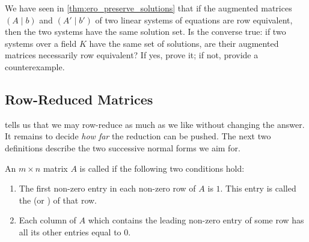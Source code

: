 \begin{exercise}
\label{exc:converse_ero_solution_set}
We have seen in \cref{thm:ero_preserve_solutions} that if the augmented matrices $(A \mid b)$ and $(A' \mid b')$ of two linear systems of equations are row equivalent, then the two systems have the same solution set. Is the converse true: if two systems over a field $K$ have the same set of solutions, are their augmented matrices necessarily row equivalent? If yes, prove it; if not, provide a counterexample.
\end{exercise}

\subsection{Row-Reduced Matrices}

 tells us that we may row-reduce as much as we like without changing the answer. It remains to decide \emph{how far} the reduction can be pushed. The next two definitions describe the two successive normal forms we aim for.

\begin{definition}
\label{def:row_reduced}
An $m \times n$ matrix $A$ is called  if the following two conditions hold:
\begin{enumerate}[label=\textbf{(\alph*)}]
    \item The first non-zero entry in each non-zero row of $A$ is $1$. This entry is called the  (or ) of that row.
    \item Each column of $A$ which contains the leading non-zero entry of some row has all its other entries equal to $0$.
\end{enumerate}
\end{definition}

